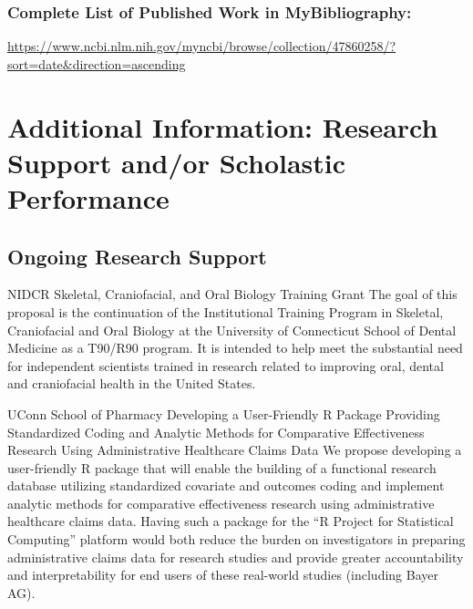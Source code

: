 \documentclass{nihbiosketch}
\begin{document}
\subsubsection*{Complete List of Published Work in MyBibliography:}
\url{https://www.ncbi.nlm.nih.gov/myncbi/browse/collection/47860258/?sort=date&direction=ascending}

\section{Additional Information: Research Support and/or Scholastic Performance}

\subsection*{Ongoing Research Support}

{NIDCR}
{Skeletal, Craniofacial, and Oral Biology Training Grant}
{The goal of this proposal is the continuation of the Institutional Training Program in Skeletal, Craniofacial and Oral Biology at the University of Connecticut School of Dental Medicine as a T90/R90 program. It is intended to help meet the substantial need for independent scientists trained in research related to improving oral, dental and craniofacial health in the United States.}

\bigskip

{UConn School of Pharmacy}
{Developing a User-Friendly R Package Providing Standardized Coding and Analytic Methods for Comparative Effectiveness Research Using Administrative Healthcare Claims Data}
{We propose developing a user-friendly R package that will enable the building of a functional research database utilizing standardized covariate and outcomes coding and implement analytic methods for comparative effectiveness research using administrative healthcare claims data.  Having such a package for the ``R Project for Statistical Computing'' platform would both reduce the burden on investigators in preparing administrative claims data for research studies and provide greater accountability and interpretability for end users of these real-world studies (including Bayer AG).}
\end{document}
